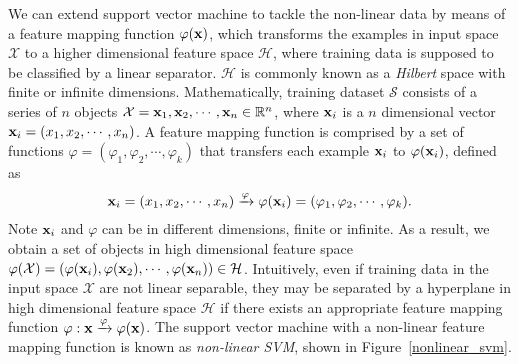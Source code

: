 \documentclass[english]{tktltiki}
\newcommand{\Hcal}{\mathcal{H}} %
\newcommand{\Xcal}{\mathcal{X}} %
\newcommand{\Scal}{\mathcal{S}}
\newcommand{\xb}{{\bf x}}
\begin{document}
We can extend support vector machine to tackle the non-linear data by means of a feature mapping function $\varphi(\xb)$, which transforms the examples in input space $\Xcal$ to a higher dimensional feature space $\Hcal$, where training data is supposed to be classified by a linear separator. $\Hcal$ is commonly known as a {\em Hilbert} space with finite or infinite dimensions. Mathematically, training dataset \(\Scal\) consists of a series of $n$ objects \(\Xcal = \xb_1,\xb_2,\cdots,\xb_n \in \mathbb{R}^n\), where $\xb_i$ is a $n$ dimensional vector $\xb_i = (x_1, x_2,\cdots,x_n)$. A feature mapping function is comprised by a set of functions $\varphi = (\varphi_1, \varphi_2, \cdots, \varphi_k)$ that transfers each example $\xb_i$ to $\varphi(\xb_i)$, defined as
\begin{align*}
\xb_i = (x_1,x_2,\cdots,x_n) \xrightarrow{\varphi} \varphi(\xb_i) = (\varphi_1,\varphi_2,\cdots,\varphi_k) \text{.}
\end{align*}
Note $\xb_i$ and $\varphi$ can be in different dimensions, finite or infinite. As a result, we obtain a set of objects in high dimensional feature space $\varphi(\Xcal) = (\varphi(\xb_i), \varphi(\xb_2),\cdots,\varphi(\xb_n)) \in \Hcal$. Intuitively, even if training data in the input space $\Xcal$ are not linear separable, they may be separated by a hyperplane in high dimensional feature space $\Hcal$ if there exists an appropriate feature mapping function $\varphi:\xb \xrightarrow{\varphi} \varphi(\xb)$. The support vector machine with a non-linear feature mapping function is known as {\em non-linear SVM}, shown in Figure~\ref{nonlinear_svm}.

\end{document}
